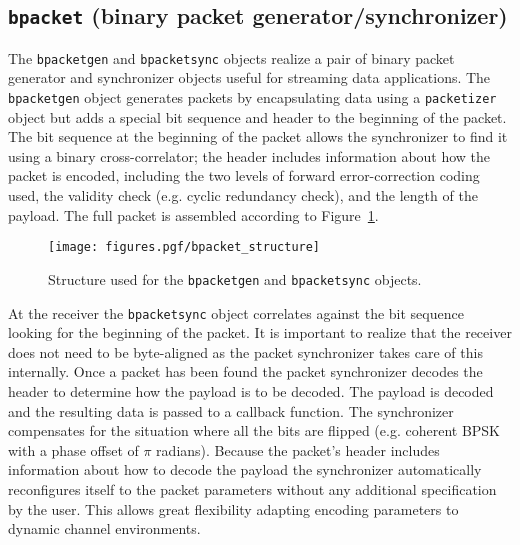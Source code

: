 \subsection{{\tt bpacket} (binary packet generator/synchronizer)}
\label{module:framing:bpacket}
The {\tt bpacketgen} and {\tt bpacketsync} objects realize a pair of
binary packet generator and synchronizer objects useful for streaming
data applications.
The {\tt bpacketgen} object generates packets by encapsulating data
using a {\tt packetizer} object but adds a special bit sequence and
header to the beginning of the packet.
The bit sequence at the beginning of the packet allows the synchronizer
to find it using a binary cross-correlator;
the header includes information about how the packet is encoded,
including the two levels of forward error-correction coding used, the
validity check (e.g. cyclic redundancy check), and the length of the
payload.
The full packet is assembled according to
Figure~\ref{fig:module:framing:bpacket_structure}.
% 
%
\begin{figure}
\centering
  \texttt{[image: figures.pgf/bpacket\_structure]}
\caption{
    Structure used for the {\tt bpacketgen} and
    {\tt bpacketsync} objects.}
\label{fig:module:framing:bpacket_structure}
\end{figure}


At the receiver
the {\tt bpacketsync} object correlates against the bit sequence looking
for the beginning of the packet.
It is important to realize that the receiver does not need to be
byte-aligned as the packet synchronizer takes care of this internally.
Once a packet has been found the packet synchronizer decodes the header
to determine how the payload is to be decoded.
The payload is decoded and the resulting data is passed to a callback
function.
The synchronizer compensates for the situation where all the bits are
flipped (e.g. coherent BPSK with a phase offset of $\pi$ radians).
Because the packet's header includes information about how to decode the
payload the synchronizer automatically reconfigures itself to the packet
parameters without any additional specification by the user.
This allows great flexibility adapting encoding parameters to dynamic
channel environments.


